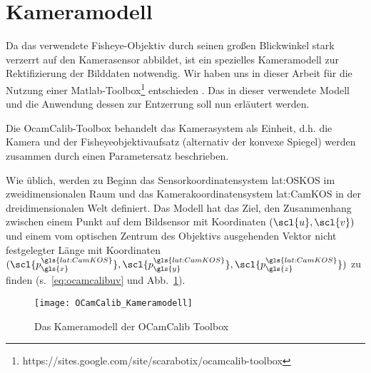 \section{Kameramodell \dcsecondauthorshort} \label{sec:kameramodell}
Da das verwendete Fisheye-Objektiv durch seinen großen Blickwinkel stark verzerrt auf den Kamerasensor abbildet, ist ein spezielles Kameramodell zur Rektifizierung der Bilddaten notwendig. Wir haben uns in dieser Arbeit für die Nutzung einer Matlab-Toolbox\footnote{https://sites.google.com/site/scarabotix/ocamcalib-toolbox} entschieden  \autocite{scaramuzzaFlexibleTechniqueAccurate2006, scaramuzzaToolboxEasilyCalibrating2006, scaramuzzaOmnidirectionalVisionCalibration2007, rufliAutomaticDetectionCheckerboards2008}. Das in dieser verwendete Modell und die Anwendung dessen zur Entzerrung soll nun erläutert werden. 

Die OcamCalib-Toolbox behandelt das Kamerasystem als Einheit, d.h. die Kamera und der Fisheyeobjektivaufsatz (alternativ der konvexe Spiegel) werden zusammen durch einen Parametersatz beschrieben.

Wie üblich, werden zu Beginn das Sensorkoordinatensystem \gls{lat:OSKOS} im zweidimensionalen Raum und das Kamerakoordinatensystem \gls{lat:CamKOS} in der dreidimensionalen Welt definiert. Das Modell hat das Ziel, den Zusammenhang zwischen einem Punkt auf dem Bildsensor  mit Koordinaten \((\scl{u}, \scl{v})\) und einem vom optischen Zentrum des Objektivs ausgehenden Vektor nicht festgelegter Länge  mit Koordinaten \((\scl{p^{\gls{lat:CamKOS}}_{\gls{x}}}, \scl{p^{\gls{lat:CamKOS}}_{\gls{y}}}, \scl{p^{\gls{lat:CamKOS}}_{\gls{z}}})\) zu finden (s.~\eqref{eq:ocamcalibuv} und Abb.~\ref{fig:kameramodell}).

\begin{figure}[H]
  \centering
  \texttt{[image: OCamCalib\_Kameramodell]}
  \caption{Das Kameramodell der OCamCalib Toolbox}
  \label{fig:kameramodell}
\end{figure}

